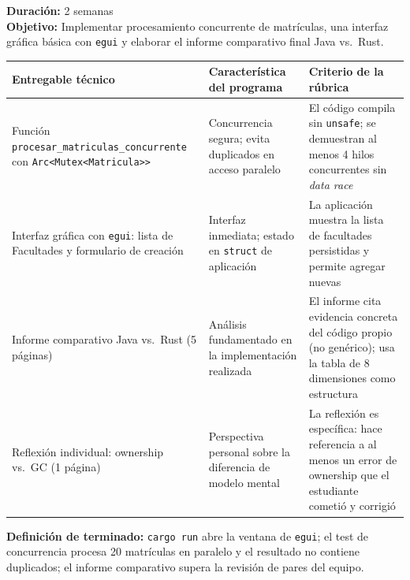 \begin{tcolorbox}[sprintBox, title={Sprint 9 — Concurrencia, GUI y comparación Java vs.\ Rust}]
	\textbf{Duración:} 2 semanas\\[4pt]
	\textbf{Objetivo:} Implementar procesamiento concurrente de matrículas, una interfaz
	gráfica básica con \texttt{egui} y elaborar el informe comparativo final Java vs.\ Rust.
	
	\vspace{6pt}
	
	\noindent
	\begin{center}
		\begin{tabular}{p{4cm}p{4cm}p{4.5cm}}
			\toprule
			\textbf{Entregable técnico} & \textbf{Característica del programa} & \textbf{Criterio de la rúbrica} \\
			\midrule
			Función \verb|procesar_matriculas_concurrente| con \verb|Arc<Mutex<Matricula>>| &
			Concurrencia segura; evita duplicados en acceso paralelo &
			El código compila sin \verb|unsafe|; se demuestran al menos 4 hilos concurrentes sin \textit{data race} \\
			\addlinespace
			Interfaz gráfica con \texttt{egui}: lista de Facultades y formulario de creación &
			Interfaz inmediata; estado en \texttt{struct} de aplicación &
			La aplicación muestra la lista de facultades persistidas y permite agregar nuevas \\
			\addlinespace
			Informe comparativo Java vs.\ Rust (5 páginas) &
			Análisis fundamentado en la implementación realizada &
			El informe cita evidencia concreta del código propio (no genérico); usa la tabla de 8 dimensiones como estructura \\
			\addlinespace
			Reflexión individual: ownership vs.\ GC (1 página) &
			Perspectiva personal sobre la diferencia de modelo mental &
			La reflexión es específica: hace referencia a al menos un error de ownership que el estudiante cometió y corrigió \\
			\bottomrule
		\end{tabular}
	\end{center}
	
	\vspace{8pt}
	\textbf{Definición de terminado:} \verb|cargo run| abre la ventana de \texttt{egui};
	el test de concurrencia procesa 20 matrículas en paralelo y el resultado no contiene
	duplicados; el informe comparativo supera la revisión de pares del equipo.
\end{tcolorbox}


